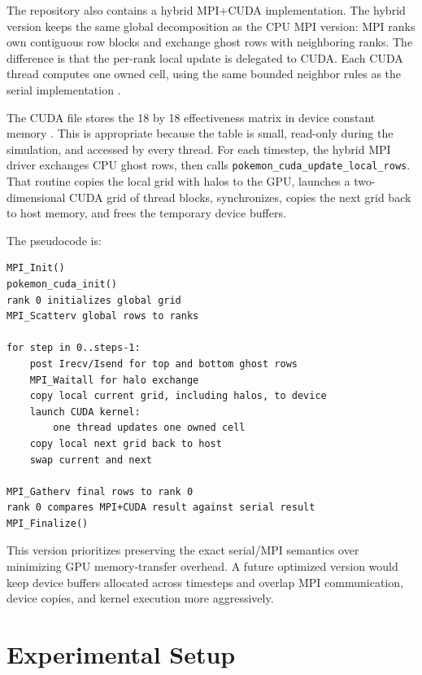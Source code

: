 \documentclass[10pt,twocolumn]{article}
\begin{document}
The repository also contains a hybrid MPI+CUDA implementation. The hybrid version keeps the same global decomposition as the CPU MPI version: MPI ranks own contiguous row blocks and exchange ghost rows with neighboring ranks. The difference is that the per-rank local update is delegated to CUDA. Each CUDA thread computes one owned cell, using the same bounded neighbor rules as the serial implementation \cite{cuda}.

The CUDA file stores the 18 by 18 effectiveness matrix in device constant memory \cite{cuda}. This is appropriate because the table is small, read-only during the simulation, and accessed by every thread. For each timestep, the hybrid MPI driver exchanges CPU ghost rows, then calls \texttt{pokemon\_cuda\_update\_local\_rows}. That routine copies the local grid with halos to the GPU, launches a two-dimensional CUDA grid of thread blocks, synchronizes, copies the next grid back to host memory, and frees the temporary device buffers.

The pseudocode is:

\begin{center}
\begin{minipage}{0.85\linewidth}
\begin{lstlisting}[frame=single]
MPI_Init()
pokemon_cuda_init()
rank 0 initializes global grid
MPI_Scatterv global rows to ranks

for step in 0..steps-1:
    post Irecv/Isend for top and bottom ghost rows
    MPI_Waitall for halo exchange
    copy local current grid, including halos, to device
    launch CUDA kernel:
        one thread updates one owned cell
    copy local next grid back to host
    swap current and next

MPI_Gatherv final rows to rank 0
rank 0 compares MPI+CUDA result against serial result
MPI_Finalize()
\end{lstlisting}
\end{minipage}
\end{center}

This version prioritizes preserving the exact serial/MPI semantics over minimizing GPU memory-transfer overhead. A future optimized version would keep device buffers allocated across timesteps and overlap MPI communication, device copies, and kernel execution more aggressively.

\section*{Experimental Setup}
\end{document}
